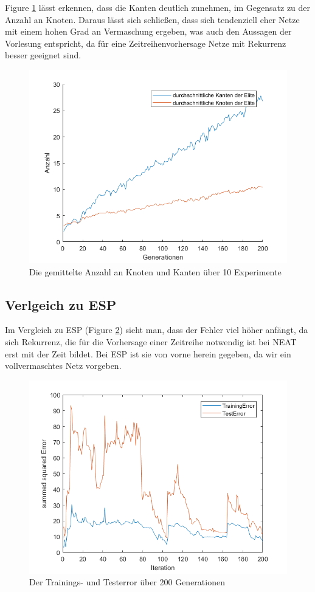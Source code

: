 \documentclass{hbrs-ecta-report}
\begin{document}
Figure \ref{fig:KantenUndKnoten} lässt erkennen, dass die Kanten deutlich zunehmen, im Gegensatz zu der Anzahl an Knoten. Daraus lässt sich schließen, dass sich tendenziell eher Netze mit einem hohen Grad an Vermaschung ergeben, was auch den Aussagen der Vorlesung entspricht, da für eine Zeitreihenvorhersage Netze mit Rekurrenz besser geeignet sind.
\begin{figure}[h!]
	\includegraphics[width=\linewidth]{img/KantenUndKnoten}
	\caption{Die gemittelte Anzahl an Knoten und Kanten über 10 Experimente}
	\label{fig:KantenUndKnoten}
\end{figure}
\subsection{Verlgeich zu ESP}
Im Vergleich zu ESP (Figure \ref{fig:ESP}) sieht man, dass der Fehler viel höher anfängt, da sich Rekurrenz, die für die Vorhersage einer Zeitreihe notwendig ist bei NEAT erst mit der Zeit bildet. Bei ESP ist sie von vorne herein gegeben, da wir ein vollvermaschtes Netz vorgeben.\\
\begin{figure}[h!]
	\includegraphics[width=\linewidth]{img/ESP2}
	\caption{Der Trainings- und Testerror über 200 Generationen}
	\label{fig:ESP}
\end{figure}
\end{document}
